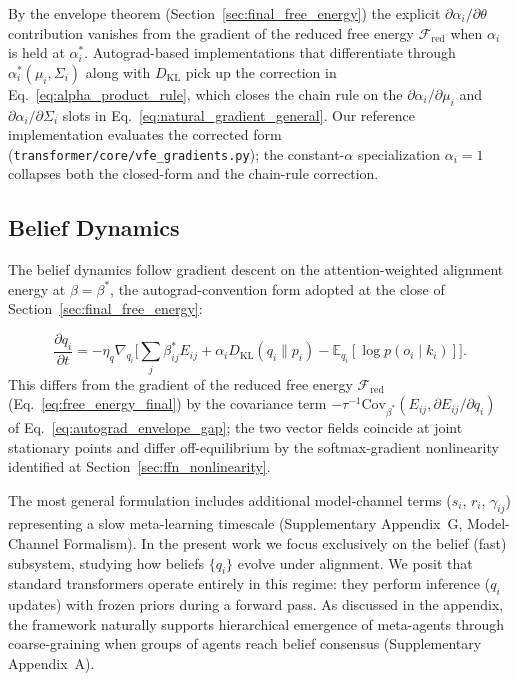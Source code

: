 \documentclass[twoside,11pt]{article}
\begin{document}
By the envelope theorem (Section~\ref{sec:final_free_energy}) the explicit $\partial \alpha_i/\partial \theta$ contribution vanishes from the gradient of the reduced free energy $\mathcal{F}_{\mathrm{red}}$ when $\alpha_i$ is held at $\alpha_i^*$. Autograd-based implementations that differentiate through $\alpha_i^*(\mu_i, \Sigma_i)$ along with $D_{\mathrm{KL}}$ pick up the correction in Eq.~\eqref{eq:alpha_product_rule}, which closes the chain rule on the $\partial \alpha_i/\partial \mu_i$ and $\partial \alpha_i/\partial \Sigma_i$ slots in Eq.~\eqref{eq:natural_gradient_general}. Our reference implementation evaluates the corrected form (\texttt{transformer/core/vfe\_gradients.py}); the constant-$\alpha$ specialization $\alpha_i = 1$ collapses both the closed-form and the chain-rule correction.


\subsection{Belief Dynamics}

The belief dynamics follow gradient descent on the attention-weighted alignment energy at $\beta = \beta^*$, the autograd-convention form adopted at the close of Section~\ref{sec:final_free_energy}:

\begin{equation}
\frac{\partial q_i}{\partial t} = -\eta_q \nabla_{q_i} \big[\textstyle\sum_j \beta_{ij}^* E_{ij} + \alpha_i D_{\mathrm{KL}}(q_i \| p_i) - \mathbb{E}_{q_i}[\log p(o_i \mid k_i)]\big].
\label{eq:belief_dynamics}
\end{equation}
This differs from the gradient of the reduced free energy $\mathcal{F}_{\mathrm{red}}$ (Eq.~\ref{eq:free_energy_final}) by the covariance term $-\tau^{-1}\mathrm{Cov}_{\beta^*}(E_{ij}, \partial E_{ij}/\partial q_i)$ of Eq.~\ref{eq:autograd_envelope_gap}; the two vector fields coincide at joint stationary points and differ off-equilibrium by the softmax-gradient nonlinearity identified at Section~\ref{sec:ffn_nonlinearity}.

The most general formulation includes additional model-channel terms ($s_i$, $r_i$, $\gamma_{ij}$) representing a slow meta-learning timescale (Supplementary Appendix~G, Model-Channel Formalism). In the present work we focus exclusively on the belief (fast) subsystem, studying how beliefs $\{q_i\}$ evolve under alignment. We posit that standard transformers operate entirely in this regime: they perform inference ($q_i$ updates) with frozen priors during a forward pass. As discussed in the appendix, the framework naturally supports hierarchical emergence of meta-agents through coarse-graining when groups of agents reach belief consensus (Supplementary Appendix~A).
\end{document}
